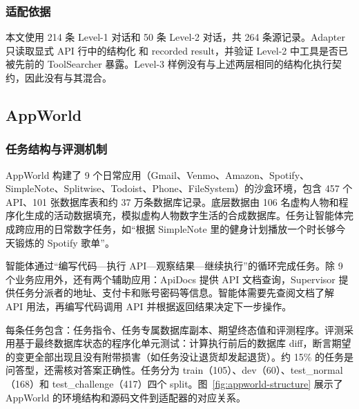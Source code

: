 \subsubsection{适配依据}

本文使用 214 条 Level-1 对话和 50 条 Level-2 对话，共 264 条源记录。Adapter 只读取显式 API 行中的结构化  和 recorded result，并验证 Level-2 中工具是否已被先前的 ToolSearcher 暴露。Level-3 样例没有与上述两层相同的结构化执行契约，因此没有与其混合。



\subsection{AppWorld}

\subsubsection{任务结构与评测机制}

AppWorld 构建了 9 个日常应用（Gmail、Venmo、Amazon、Spotify、SimpleNote、Splitwise、Todoist、Phone、FileSystem）的沙盒环境，包含 457 个 API、101 张数据库表和约 37 万条数据库记录\citep{trivedi2024appworld}。底层数据由 106 名虚构人物和程序化生成的活动数据填充，模拟虚构人物数字生活的合成数据库。任务让智能体完成跨应用的日常数字任务，如“根据 SimpleNote 里的健身计划播放一个时长够今天锻炼的 Spotify 歌单”。

智能体通过“编写代码—执行 API—观察结果—继续执行”的循环完成任务。除 9 个业务应用外，还有两个辅助应用：ApiDocs 提供 API 文档查询，Supervisor 提供任务分派者的地址、支付卡和账号密码等信息。智能体需要先查阅文档了解 API 用法，再编写代码调用 API 并根据返回结果决定下一步操作。

每条任务包含：任务指令、任务专属数据库副本、期望终态值和评测程序。评测采用基于最终数据库状态的程序化单元测试：计算执行前后的数据库 diff，断言期望的变更全部出现且没有附带损害（如任务没让退货却发起退货）。约 15\% 的任务是问答型，还需核对答案正确性。任务分为 train（105）、dev（60）、test\_normal（168）和 test\_challenge（417）四个 split。图~\ref{fig:appworld-structure} 展示了 AppWorld 的环境结构和源码文件到适配器的对应关系。

